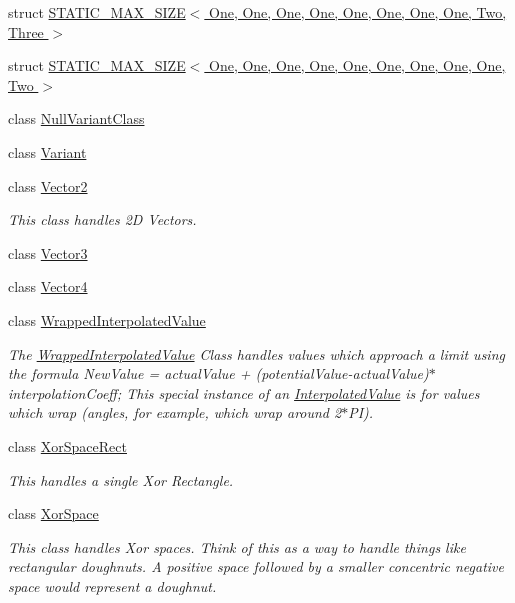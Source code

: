 \begin{CompactItemize}
\item 
struct \hyperlink{struct_j_g_t_l_1_1_s_t_a_t_i_c___m_a_x___s_i_z_e_3_01_one_00_01_one_00_01_one_00_01_one_00_01_on0da18bc47224201889d1e0cafe760a2c}{STATIC\_\-MAX\_\-SIZE$<$ One, One, One, One, One, One, One, One, Two, Three $>$}
\item 
struct \hyperlink{struct_j_g_t_l_1_1_s_t_a_t_i_c___m_a_x___s_i_z_e_3_01_one_00_01_one_00_01_one_00_01_one_00_01_on8bad4fe85b3207b51b4ba282cb73273e}{STATIC\_\-MAX\_\-SIZE$<$ One, One, One, One, One, One, One, One, One, Two $>$}
\item 
class \hyperlink{class_j_g_t_l_1_1_null_variant_class}{Null\-Variant\-Class}
\item 
class \hyperlink{class_j_g_t_l_1_1_variant}{Variant}
\item 
class \hyperlink{class_j_g_t_l_1_1_vector2}{Vector2}
\begin{CompactList}\small\item\em This class handles 2D Vectors. \item\end{CompactList}\item 
class \hyperlink{class_j_g_t_l_1_1_vector3}{Vector3}
\item 
class \hyperlink{class_j_g_t_l_1_1_vector4}{Vector4}
\item 
class \hyperlink{class_j_g_t_l_1_1_wrapped_interpolated_value}{Wrapped\-Interpolated\-Value}
\begin{CompactList}\small\item\em The \hyperlink{class_j_g_t_l_1_1_wrapped_interpolated_value}{Wrapped\-Interpolated\-Value} Class handles values which approach a limit using the formula New\-Value = actual\-Value + (potential\-Value-actual\-Value)$\ast$interpolation\-Coeff; This special instance of an \hyperlink{class_j_g_t_l_1_1_interpolated_value}{Interpolated\-Value} is for values which wrap (angles, for example, which wrap around 2$\ast$PI). \item\end{CompactList}\item 
class \hyperlink{class_j_g_t_l_1_1_xor_space_rect}{Xor\-Space\-Rect}
\begin{CompactList}\small\item\em This handles a single Xor Rectangle. \item\end{CompactList}\item 
class \hyperlink{class_j_g_t_l_1_1_xor_space}{Xor\-Space}
\begin{CompactList}\small\item\em This class handles Xor spaces. Think of this as a way to handle things like rectangular doughnuts. A positive space followed by a smaller concentric negative space would represent a doughnut. \item\end{CompactList}\end{CompactItemize}
